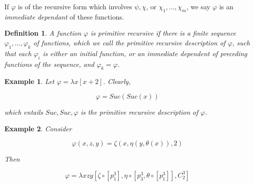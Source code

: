 \documentclass[a4paper, 12pt]{article}
\newtheorem{example}{Example}
\newtheorem{example}{Example} \newtheorem{definition}{Definition}
\begin{document}
If $\varphi$ is of the recursive form which involves $\psi, \chi$, or 
$\chi_1,\ldots, \chi_m$, we say $\varphi$ is an \textit{immediate dependant}
of these functions.

\begin{definition}
    A function $\varphi$ is primitive recursive if there is a finite sequence 
    $\varphi_1,\ldots, \varphi_k$ of functions, which we call the primitive 
    recursive description of $\varphi$, such that each $\varphi_i$ is 
    either an initial function, or an immediate dependent of preceding 
    functions of the sequence, and $\varphi_k = \varphi$.
\end{definition}

\begin{example}
    Let $\varphi = \lambda x\left[ x + 2 \right] $. Clearly, 

    \begin{equation*}
        \varphi = Suc \left( Suc(x) \right) 
    \end{equation*}

    which entails $Suc, Suc, \varphi$ is the primitive recursive description
    of $\varphi$.


\end{example}

\begin{example}
    Consider 

    \begin{equation*}
        \varphi(x, z, y) = \zeta\left( x, \eta\left( y, \theta(x) \right), 2  \right) 
    \end{equation*}

    Then 

    \begin{equation*}
        \varphi = \lambda xzy \left[ \zeta \circ \left[ p_1^3 \right], \eta \circ \left[ p_3^3, \theta \circ \left[ p_1^3 \right]  \right], C_2^3   \right]  
    \end{equation*}

\end{example}
\end{document}
